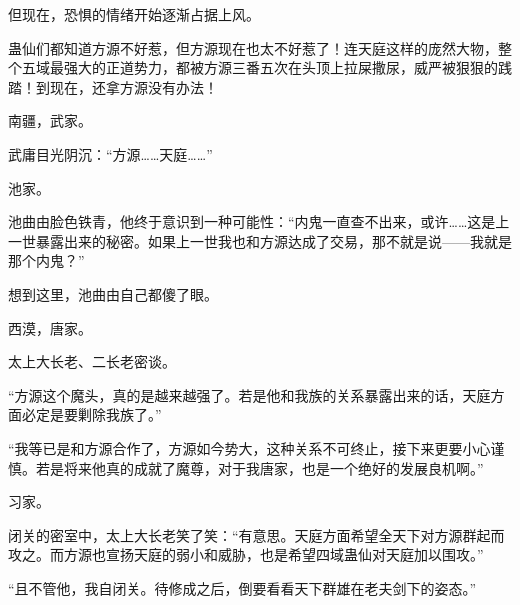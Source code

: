 \begin{this_body}
但现在，恐惧的情绪开始逐渐占据上风。

蛊仙们都知道方源不好惹，但方源现在也太不好惹了！连天庭这样的庞然大物，整个五域最强大的正道势力，都被方源三番五次在头顶上拉屎撒尿，威严被狠狠的践踏！到现在，还拿方源没有办法！

南疆，武家。

武庸目光阴沉：“方源……天庭……”

池家。

池曲由脸色铁青，他终于意识到一种可能性：“内鬼一直查不出来，或许……这是上一世暴露出来的秘密。如果上一世我也和方源达成了交易，那不就是说——我就是那个内鬼？”

想到这里，池曲由自己都傻了眼。

西漠，唐家。

太上大长老、二长老密谈。

“方源这个魔头，真的是越来越强了。若是他和我族的关系暴露出来的话，天庭方面必定是要剿除我族了。”

“我等已是和方源合作了，方源如今势大，这种关系不可终止，接下来更要小心谨慎。若是将来他真的成就了魔尊，对于我唐家，也是一个绝好的发展良机啊。”

习家。

闭关的密室中，太上大长老笑了笑：“有意思。天庭方面希望全天下对方源群起而攻之。而方源也宣扬天庭的弱小和威胁，也是希望四域蛊仙对天庭加以围攻。”

“且不管他，我自闭关。待修成之后，倒要看看天下群雄在老夫剑下的姿态。”

\end{this_body}

